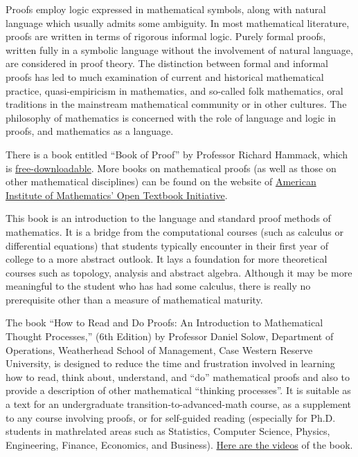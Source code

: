 \documentclass{article}
\begin{document}
Proofs employ logic expressed in mathematical symbols, along with natural language which usually admits some ambiguity. In most mathematical literature, proofs are written in terms of rigorous informal logic. Purely formal proofs, written fully in a symbolic language without the involvement of natural language, are considered in proof theory. The distinction between formal and informal proofs has led to much examination of current and historical mathematical practice, quasi-empiricism in mathematics, and so-called folk mathematics, oral traditions in the mainstream mathematical community or in other cultures. The philosophy of mathematics is concerned with the role of language and logic in proofs, and mathematics as a language.

There is a book entitled “Book of Proof” by Professor Richard Hammack, which is \href{https://www.people.vcu.edu/~rhammack/BookOfProof/}{free-downloadable}. More books on mathematical proofs (as well as those on other mathematical disciplines) can be found on the website of \href{https://aimath.org/textbooks/approved-textbooks/}{American Institute of Mathematics' Open Textbook Initiative}.

This book is an introduction to the language and standard proof methods of mathematics. It is a bridge from the computational courses (such as calculus or differential equations) that students typically encounter in their first year of college to a more abstract outlook. It lays a foundation for more theoretical courses such as topology, analysis and abstract algebra. Although it may be more meaningful to the student who has had some calculus, there is really no prerequisite other than a measure of mathematical maturity.

The book “How to Read and Do Proofs: An Introduction to Mathematical Thought Processes,” (6th Edition) by Professor Daniel Solow, Department of Operations, Weatherhead School of Management, Case Western Reserve University, is designed to reduce the time and frustration involved in learning how to read, think about, understand, and “do” mathematical proofs and also to provide a description of other mathematical “thinking processes”. It is suitable as a text for an undergraduate transition-to-advanced-math course, as a supplement to any course involving proofs, or for self-guided reading (especially for Ph.D. students in mathrelated areas such as Statistics, Computer Science, Physics, Engineering, Finance, Economics, and Business). \href{https://bcs.wiley.com/he-bcs/Books?action=resource&bcsId=8432&itemId=1118164024&resourceId=33036}{Here are the videos} of the book.
\end{document}
